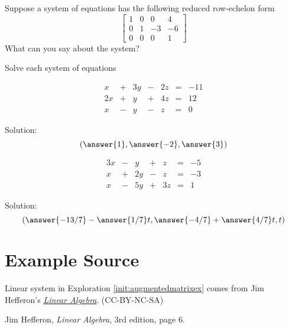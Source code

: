 \documentclass{ximera}
\begin{document}
\begin{problem} \label{prob:numberofsolutionsmultch}
Suppose a system of equations has the following reduced row-echelon form
  $$\left[\begin{array}{ccc|c}  
 1&0&0&4\\0&1&-3&-6\\0&0&0&1
 \end{array}\right]$$
 What can you say about the system?
 \begin{multipleChoice}
 \end{multipleChoice}
  \end{problem}
\begin{problem}
Solve each system of equations
\begin{problem}\label{prob:sys20solvesys1}
$$\begin{array}{ccccccc}
      x & +&3y&-&2z&= &-11 \\
	 2x& +&y&+&4z&=&12\\
     x& -&y&-&z&=&0
    \end{array}$$
    
    Solution:
    $$(\answer{1}, \answer{-2}, \answer{3})$$
\end{problem}

\begin{problem}\label{prob:sys20solvesys2}
$$\begin{array}{ccccccc}
      3x & -&y&+&z&= &-5 \\
	 x& +&2y&-&z&=&-3\\
     x& -&5y&+&3z&=&1
    \end{array}$$
    
    Solution:
    $$\left(\answer{-13/7}-\answer{1/7}t, \answer{-4/7}+\answer{4/7}t, t\right)$$
\end{problem}
\end{problem}

\section*{Example Source} 

Linear system in Exploration \ref{init:augmentedmatrixex} comes from Jim Hefferon's \href{http://joshua.smcvt.edu/linearalgebra/#current_version}{\it Linear Algebra}. (CC-BY-NC-SA)

Jim Hefferon, {\it Linear Algebra}, 3rd edition, page 6.
\end{document}
